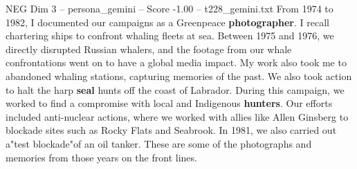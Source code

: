 \begin{textsample}{NEG Dim 3 – persona\_gemini – Score -1.00 – t228\_gemini.txt}  \label{ex:f3_neg_014}
From 1974 to 1982, I documented our campaigns as a Greenpeace \textbf{photographer}.
I recall chartering ships to confront whaling fleets at sea.
Between 1975 and 1976, we directly disrupted Russian whalers, and the footage from our whale confrontations went on to have a global media impact.
My work also took me to abandoned whaling stations, capturing memories of the past.
We also took action to halt the harp \textbf{seal} hunts off the coast of Labrador.
During this campaign, we worked to find a compromise with local and Indigenous \textbf{hunters}.
Our efforts included anti-nuclear actions, where we worked with allies like Allen Ginsberg to blockade sites such as Rocky Flats and Seabrook.
In 1981, we also carried out a"test blockade"of an oil tanker.
These are some of the photographs and memories from those years on the front lines.

\end{textsample}
